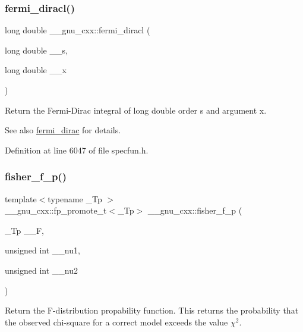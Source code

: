 \subsubsection{\texorpdfstring{fermi\+\_\+diracl()}{fermi\_diracl()}}
{\footnotesize\ttfamily long double \+\_\+\+\_\+gnu\+\_\+cxx\+::fermi\+\_\+diracl (\begin{DoxyParamCaption}\item[{long double}]{\+\_\+\+\_\+s,  }\item[{long double}]{\+\_\+\+\_\+x }\end{DoxyParamCaption})\hspace{0.3cm}{\ttfamily [inline]}}

Return the Fermi-\/\+Dirac integral of {\ttfamily  long double } order s and argument x.

\begin{DoxySeeAlso}{See also}
\hyperlink{group__gnu__math__spec__func_ga5468fbaed5cb8384cff7cfb9d2188d1a}{fermi\+\_\+dirac} for details. 
\end{DoxySeeAlso}


Definition at line 6047 of file specfun.\+h.

\mbox{\label{group__gnu__math__spec__func_ga1c769cbf42c1abecc6881cfe67dc6d14}} 
\subsubsection{\texorpdfstring{fisher\+\_\+f\+\_\+p()}{fisher\_f\_p()}}
{\footnotesize\ttfamily template$<$typename \+\_\+\+Tp $>$ \\
\+\_\+\+\_\+gnu\+\_\+cxx\+::fp\+\_\+promote\+\_\+t$<$\+\_\+\+Tp$>$ \+\_\+\+\_\+gnu\+\_\+cxx\+::fisher\+\_\+f\+\_\+p (\begin{DoxyParamCaption}\item[{\+\_\+\+Tp}]{\+\_\+\+\_\+F,  }\item[{unsigned int}]{\+\_\+\+\_\+nu1,  }\item[{unsigned int}]{\+\_\+\+\_\+nu2 }\end{DoxyParamCaption})}



Return the F-\/distribution propability function. This returns the probability that the observed chi-\/square for a correct model exceeds the value $ \chi^2 $. 

